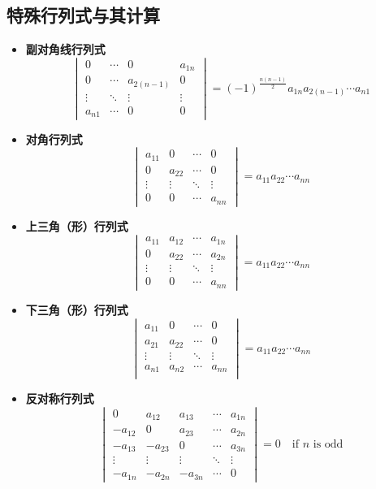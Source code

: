\documentclass[UTF8]{ctexart}
\begin{document}
\subsection*{特殊行列式与其计算}
\begin{itemize}
  \item \textbf{副对角线行列式}
  \[\begin{vmatrix}
  0&\cdots&0&a_{1n}\\
  0&\cdots&a_{2(n-1)}&0\\
  \vdots&\ddots&\vdots&\vdots\\
  a_{n1}&\cdots&0&0
  \end{vmatrix}
  =(-1)^{\frac{n(n-1)}{2}}a_{1n}a_{2(n-1)}\cdots a_{n1}
  \]
  \item \textbf{对角行列式}
  \[\begin{vmatrix}
  a_{11}&0 & \cdots & 0\\
  0&a_{22} & \cdots & 0\\
  \vdots&\vdots&\ddots&\vdots\\
  0&0&\cdots&a_{nn}
  \end{vmatrix}
  =a_{11}a_{22}\cdots a_{nn}\]
  \item \textbf{上三角（形）行列式}
  \[\begin{vmatrix}
  a_{11}&a_{12}&\cdots&a_{1n}\\
  0&a_{22}&\cdots&a_{2n}\\
  \vdots&\vdots&\ddots&\vdots\\
  0&0&\cdots&a_{nn}
  \end{vmatrix}
  =a_{11}a_{22}\cdots a_{nn}\]
  \item \textbf{下三角（形）行列式}
  \[\begin{vmatrix}
  a_{11}&0&\cdots&0\\
  a_{21}&a_{22}&\cdots&0\\
  \vdots&\vdots&\ddots&\vdots\\
  a_{n1}&a_{n2}&\cdots&a_{nn}\\
  \end{vmatrix}
  =a_{11}a_{22}\cdots a_{nn}\]
  \item \textbf{反对称行列式}
  \[\begin{vmatrix}
  0&a_{12}&a_{13}&\cdots&a_{1n}\\
  -a_{12}&0&a_{23}&\cdots&a_{2n}\\
  -a_{13}&-a_{23}&0&\cdots&a_{3n}\\
  \vdots&\vdots&\vdots&\ddots&\vdots\\
  -a_{1n}&-a_{2n}&-a_{3n}&\cdots&0
\end{vmatrix}
= 0\quad \text{if }n\text{ is odd}\]
\end{itemize}
\end{document}
